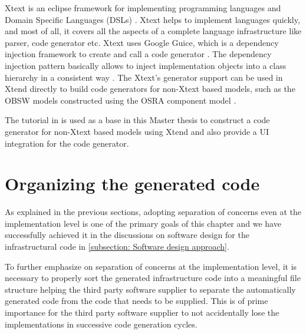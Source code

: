 Xtext is an eclipse framework for implementing programming languages and Domain Specific Languages (DSLs) \cite{Xtend}. Xtext helps to implement languages quickly, and most of all, it covers all the aspects of a complete language infrastructure like parser, code generator etc. Xtext uses Google Guice, which is a dependency injection framework to create and call a code generator \cite{Xtend}. The dependency injection pattern basically allows to inject implementation objects into a class hierarchy in a consistent way \cite{InvOfCntrlurl}. The Xtext's generator support can be used in Xtend directly to build code generators for non-Xtext based models, such as the OBSW models constructed using the OSRA component model \cite{CodeGenEclXtend}. 

The tutorial in \cite{CodeGenNonXtext} is used as a base in this Master thesis to construct a code generator for non-Xtext based models using Xtend and also provide a UI integration for the code generator.

\section{Organizing the generated code}
\label{section: Code organization}
As explained in the previous sections, adopting separation of concerns even at the implementation level is one of the primary goals of this chapter and we have successfully achieved it in the discussions on software design for the infrastructural code in \cref{subsection: Software design approach}. 

To further emphasize on separation of concerns at the implementation level, it is necessary to properly sort the generated infrastructure code into a meaningful file structure helping the third party software supplier to separate the automatically generated code from the code that needs to be supplied. This is of prime importance for the third party software supplier to not accidentally lose the implementations in successive code generation cycles. 

